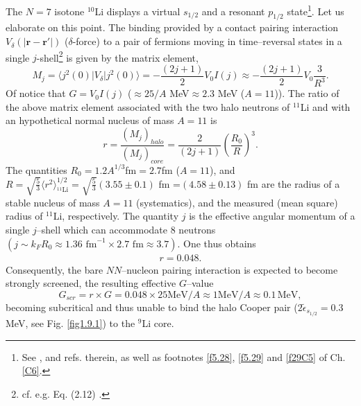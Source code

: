   The $N=7$ isotone $^{10}$Li displays a virtual $s_{1/2}$ and a resonant $p_{1/2}$ state\footnote{See  \cite{Barranco:20}, \cite{Moro:19} and refs. therein, as well as footnotes \ref{f5.28},   \ref{f5.29}  and \ref{f29C5} of Ch. \ref{C6}.}. Let us elaborate on this point. 
The binding provided by a contact pairing interaction $V_\delta (|\mathbf{r}-\mathbf{r}'|)$ ($\delta$-force) to a pair of fermions moving in time--reversal states in a single $j$-shell\footnote{cf. e.g. Eq. (2.12) \cite{Brink:05}.} is given by the matrix element,
\begin{equation}
M_j=\langle j^2(0)|V_\delta|j^2(0)\rangle=-\frac{(2j+1)}{2} V_0 I(j)\approx -\frac{(2j+1)}{2}V_0\frac{3}{R^3}.
\end{equation} 
Of notice that $G=V_0I(j)$ ($\approx 25/A$ MeV$\approx 2.3$ MeV ($A=11$)). 
The ratio of the above matrix element associated with the two halo neutrons of $^{11}$Li and with an hypothetical normal nucleus of mass $A=11$ is
\begin{equation}
r=\frac{(M_j)_{halo}}{(M_j)_{core}}=\frac{2}{(2j+1)}\left(\frac{R_0}{R}\right)^3.
\end{equation}
The quantities $R_0=1.2 A^{1/3}$fm$=2.7$fm ($A=11$), and $R=\sqrt{\frac{5}{3}}\langle r^2\rangle^{1/2}_{^{11}\text{Li}}=\sqrt{\frac{5}{3}}(3.55\pm0.1)$ fm =$(4.58\pm 0.13)$ fm are the radius of a stable nucleus of mass $A=11$ (systematics), and  the measured (mean square) radius of $^{11}$Li, respectively. The quantity $j$ is the effective angular momentum of a single $j$--shell which can accommodate 8 neutrons $(j\sim k_F R_0\approx 1.36 \text{ fm}^{-1}\times2.7\text{ fm}\approx3.7)$. One thus obtains
\begin{align}\label{eq2.6.3}
r=0.048.
\end{align}
 Consequently, the bare $NN$--nucleon pairing interaction is expected to become strongly screened, the resulting effective $G$--value 
\begin{equation}\label{eq1C2AppF}
G_{scr}=r\times G=0.048\times 25 \text{MeV}/A\approx 1 \text{MeV}/A\approx 0.1\,\text{MeV},
\end{equation}
becoming subcritical and thus unable to bind the halo Cooper pair ($2\tilde \epsilon_{s_{1/2}}=0.3$ MeV, see Fig. \ref{fig1.9.1}) to the $^9$Li core.


